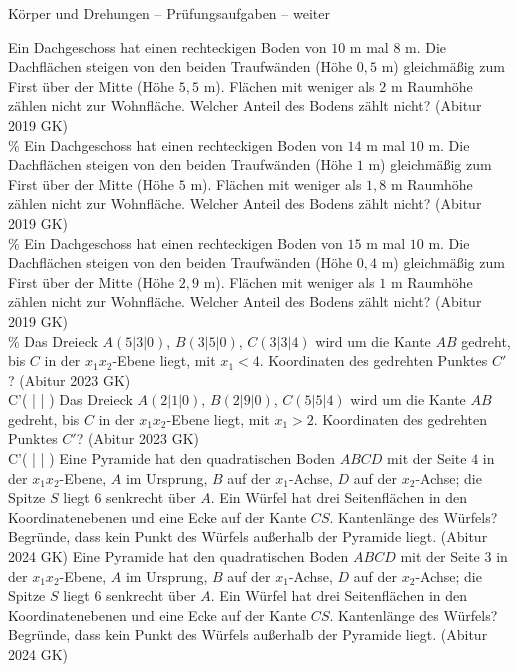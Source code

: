 \begin{aufgabe}{Körper und Drehungen – Prüfungsaufgaben – weiter}
\begin{teile}
\teil Ein Dachgeschoss hat einen rechteckigen Boden von $10$ m mal $8$ m. Die Dachflächen steigen von den beiden Traufwänden (Höhe $0{,}5$ m) gleichmäßig zum First über der Mitte (Höhe $5{,}5$ m). Flächen mit weniger als $2$ m Raumhöhe zählen nicht zur Wohnfläche. Welcher Anteil des Bodens zählt nicht? \hfill (Abitur 2019 GK) \\ \leerfeld \%
\teil Ein Dachgeschoss hat einen rechteckigen Boden von $14$ m mal $10$ m. Die Dachflächen steigen von den beiden Traufwänden (Höhe $1$ m) gleichmäßig zum First über der Mitte (Höhe $5$ m). Flächen mit weniger als $1{,}8$ m Raumhöhe zählen nicht zur Wohnfläche. Welcher Anteil des Bodens zählt nicht? \hfill (Abitur 2019 GK) \\ \leerfeld \%
\teil Ein Dachgeschoss hat einen rechteckigen Boden von $15$ m mal $10$ m. Die Dachflächen steigen von den beiden Traufwänden (Höhe $0{,}4$ m) gleichmäßig zum First über der Mitte (Höhe $2{,}9$ m). Flächen mit weniger als $1$ m Raumhöhe zählen nicht zur Wohnfläche. Welcher Anteil des Bodens zählt nicht? \hfill (Abitur 2019 GK) \\ \leerfeld \%
\teil Das Dreieck $A(5 | 3 | 0)$, $B(3 | 5 | 0)$, $C(3 | 3 | 4)$ wird um die Kante $AB$ gedreht, bis $C$ in der $x_1x_2$-Ebene liegt, mit $x_1 < 4$. Koordinaten des gedrehten Punktes $C'$? \hfill (Abitur 2023 GK) \\ C'( \leerfeld | \leerfeld | \leerfeld )
\teil Das Dreieck $A(2 | 1 | 0)$, $B(2 | 9 | 0)$, $C(5 | 5 | 4)$ wird um die Kante $AB$ gedreht, bis $C$ in der $x_1x_2$-Ebene liegt, mit $x_1 > 2$. Koordinaten des gedrehten Punktes $C'$? \hfill (Abitur 2023 GK) \\ C'( \leerfeld | \leerfeld | \leerfeld )
\teil Eine Pyramide hat den quadratischen Boden $ABCD$ mit der Seite $4$ in der $x_1x_2$-Ebene, $A$ im Ursprung, $B$ auf der $x_1$-Achse, $D$ auf der $x_2$-Achse; die Spitze $S$ liegt $6$ senkrecht über $A$. Ein Würfel hat drei Seitenflächen in den Koordinatenebenen und eine Ecke auf der Kante $CS$. Kantenlänge des Würfels? Begründe, dass kein Punkt des Würfels außerhalb der Pyramide liegt. \hfill (Abitur 2024 GK)
\teil Eine Pyramide hat den quadratischen Boden $ABCD$ mit der Seite $3$ in der $x_1x_2$-Ebene, $A$ im Ursprung, $B$ auf der $x_1$-Achse, $D$ auf der $x_2$-Achse; die Spitze $S$ liegt $6$ senkrecht über $A$. Ein Würfel hat drei Seitenflächen in den Koordinatenebenen und eine Ecke auf der Kante $CS$. Kantenlänge des Würfels? Begründe, dass kein Punkt des Würfels außerhalb der Pyramide liegt. \hfill (Abitur 2024 GK)

\end{teile}
\end{aufgabe}
